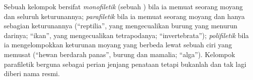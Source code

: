 \begin{definition}\label{def:b1:classifying-biodiversity:monophyly}
Sebuah kelompok bersifat \emph{monofiletik} (sebuah ) bila ia
memuat seorang moyang dan seluruh keturunannya; \emph{parafiletik}
bila ia memuat seorang moyang dan hanya sebagian keturunannya
(``reptilia'', yang mengecualikan burung yang menurun darinya;
``ikan'', yang mengecualikan tetrapodanya; ``invertebrata'');
\emph{polifiletik} bila ia mengelompokkan keturunan moyang yang
berbeda lewat sebuah ciri yang memusat (``hewan berdarah panas'',
burung dan mamalia; ``alga''). Kelompok parafiletik berguna sebagai
perian jenjang penataan tetapi bukanlah  dan tak lagi diberi nama
resmi.
\end{definition}

